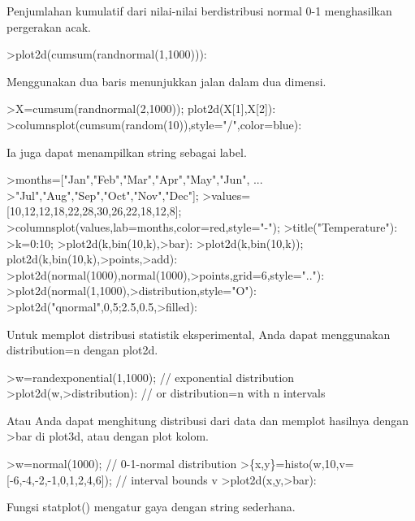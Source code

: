 \documentclass[a4paper,10pt]{article}
\begin{document}
\begin{eulernotebook}
\begin{eulercomment}
\begin{eulercomment}
\begin{eulercomment}
\begin{eulercomment}
\begin{eulercomment}
\begin{eulercomment}
\begin{eulercomment}
\begin{eulercomment}
\begin{eulercomment}
\begin{eulercomment}
\begin{eulercomment}
\begin{eulercomment}
\begin{eulercomment}
Penjumlahan kumulatif dari nilai-nilai berdistribusi normal 0-1
menghasilkan pergerakan acak.
\end{eulercomment}
\begin{eulerprompt}
>plot2d(cumsum(randnormal(1,1000))):
\end{eulerprompt}
\begin{eulercomment}
Menggunakan dua baris menunjukkan jalan dalam dua dimensi.
\end{eulercomment}
\begin{eulerprompt}
>X=cumsum(randnormal(2,1000)); plot2d(X[1],X[2]):
>columnsplot(cumsum(random(10)),style="/",color=blue):
\end{eulerprompt}
\begin{eulercomment}
Ia juga dapat menampilkan string sebagai label.
\end{eulercomment}
\begin{eulerprompt}
>months=["Jan","Feb","Mar","Apr","May","Jun", ...
>"Jul","Aug","Sep","Oct","Nov","Dec"];
>values=[10,12,12,18,22,28,30,26,22,18,12,8];
>columnsplot(values,lab=months,color=red,style="-");
>title("Temperature"):
>k=0:10;
>plot2d(k,bin(10,k),>bar):
>plot2d(k,bin(10,k)); plot2d(k,bin(10,k),>points,>add):
>plot2d(normal(1000),normal(1000),>points,grid=6,style=".."):
>plot2d(normal(1,1000),>distribution,style="O"):
>plot2d("qnormal",0,5;2.5,0.5,>filled):
\end{eulerprompt}
\begin{eulercomment}
Untuk memplot distribusi statistik eksperimental, Anda dapat
menggunakan distribution=n dengan plot2d.
\end{eulercomment}
\begin{eulerprompt}
>w=randexponential(1,1000); // exponential distribution
>plot2d(w,>distribution): // or distribution=n with n intervals
\end{eulerprompt}
\begin{eulercomment}
Atau Anda dapat menghitung distribusi dari data dan memplot hasilnya
dengan \textgreater{}bar di plot3d, atau dengan plot kolom.
\end{eulercomment}
\begin{eulerprompt}
>w=normal(1000); // 0-1-normal distribution
>\{x,y\}=histo(w,10,v=[-6,-4,-2,-1,0,1,2,4,6]); // interval bounds v
>plot2d(x,y,>bar):
\end{eulerprompt}
\begin{eulercomment}
Fungsi statplot() mengatur gaya dengan string sederhana.
\end{eulercomment}
\begin{eulerprompt}

\end{eulerprompt}
\end{eulercomment}
\end{eulercomment}
\end{eulercomment}
\end{eulercomment}
\end{eulercomment}
\end{eulercomment}
\end{eulercomment}
\end{eulercomment}
\end{eulercomment}
\end{eulercomment}
\end{eulercomment}
\end{eulercomment}
\end{eulernotebook}
\end{document}
